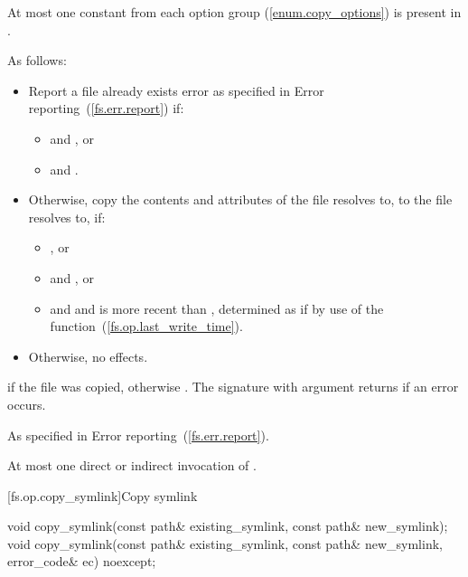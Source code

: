 \begin{itemdescr}
\pnum
\requires At most one constant from each 
  option group (\ref{enum.copy_options}) is present
  in .

\pnum
\effects
As follows:
\begin{itemize}
\item
Report a file already exists error as specified in
    Error reporting~(\ref{fs.err.report}) if:
\begin{itemize}
\item {} and , or
\item {} and .
\end{itemize}

\item
Otherwise, copy the contents and attributes of the file 
    resolves to, to the file  resolves to, if:
\begin{itemize}
\item {}, or
\item {} and , or
\item {} and  and 
      is more recent than , determined as if by use of the  function~(\ref{fs.op.last_write_time}).
\end{itemize}

\item
Otherwise, no effects.
\end{itemize}

\pnum
\returns {} if the  file
  was copied, otherwise . The signature with argument  returns
   if an error occurs.

\pnum
\throws As specified in Error reporting~(\ref{fs.err.report}).

\pnum
\complexity At most one direct or indirect invocation of .
\end{itemdescr}

[fs.op.copy_symlink]{Copy symlink}

\begin{itemdecl}
void copy_symlink(const path& existing_symlink, const path& new_symlink);
void copy_symlink(const path& existing_symlink, const path& new_symlink,
                  error_code& ec) noexcept;
\end{itemdecl}

